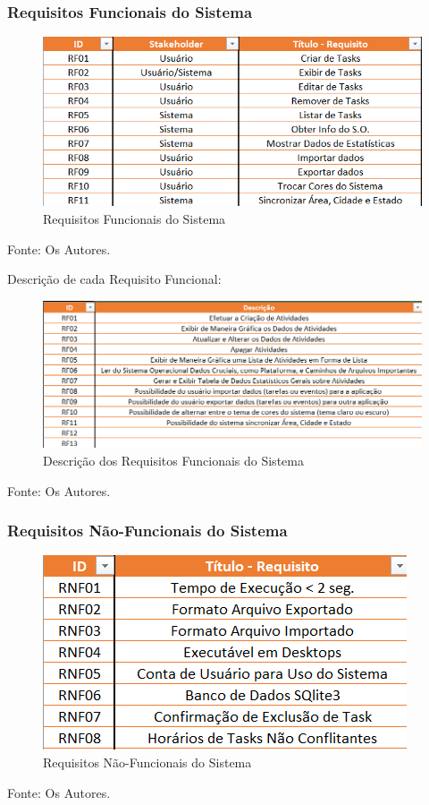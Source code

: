 \documentclass[a4paper,12pt]{article}
\begin{document}
\subsubsection{Requisitos Funcionais do Sistema}
\begin{figure}[H]
	\centering
	\includegraphics[scale=0.80]{requirements/functionals/requirements.png}
	\caption{Requisitos Funcionais do Sistema}
\end{figure}
\noindent Fonte: Os Autores.

\pagebreak
Descrição de cada Requisito Funcional:
\begin{figure}[H]
	\centering
	\includegraphics[scale=0.80]{requirements/functionals/description.png}
	\caption{Descrição dos Requisitos Funcionais do Sistema}
\end{figure}
\noindent Fonte: Os Autores.


\subsubsection{Requisitos Não-Funcionais do Sistema}
\begin{figure}[H]
	\centering
	\includegraphics[scale=0.80]{requirements/not-functionals/not-functionals.png}
	\caption{Requisitos Não-Funcionais do Sistema}
\end{figure}
\noindent Fonte: Os Autores.
\end{document}
